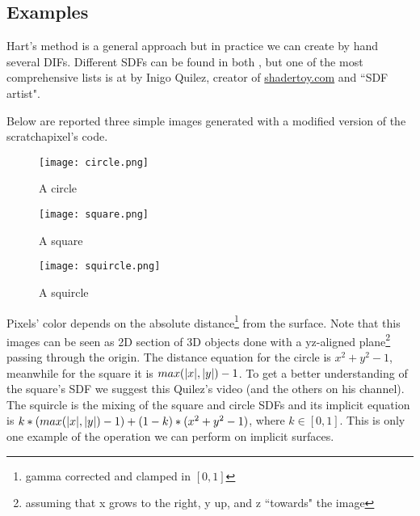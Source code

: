 

\subsection{Examples}
Hart's method is a general approach but in practice we can create by hand several DIFs.
Different SDFs can be found in both \cite{hart1996,scratch_sdf}, but one of the most comprehensive lists is at \cite{iquilez_sdf} by Inigo Quilez, creator of \url{shadertoy.com}  and ``SDF artist".

Below are reported three simple images generated with a modified version of the scratchapixel's code\cite{scratch_sdf}.
\begin{figure}[!htb]
  \texttt{[image: circle.png]}
  \caption{A circle}\label{fig:circle}
\endminipage\hfill
{}
  \texttt{[image: square.png]}
  \caption{A square}\label{fig:square}
\endminipage\hfill
{}%
  \texttt{[image: squircle.png]}
  \caption{A squircle}\label{fig:squircle}
\endminipage
\end{figure}
Pixels' color depends on the absolute distance\footnote{gamma corrected and clamped in $[0,1]$} from the surface.
Note that this images can be seen as 2D section of 3D objects done with a yz-aligned plane\footnote{assuming that x grows to the right, y up, and z ``towards" the image} passing through the origin.
The distance equation for the circle is $x^2 + y^2 - 1$, meanwhile for the square it is $max(\lvert x \lvert, \lvert y \lvert) - 1$.
To get a better understanding of the square's SDF we suggest this Quilez's video \cite{iquilez_sdf_box} (and the others on his channel).
The squircle is the mixing of the square and circle SDFs and its implicit equation is
$ k * (max(\lvert x \lvert, \lvert y \lvert) - 1) + (1-k) * (x^2 + y^2 - 1) $, where $k \in [0,1]$.
This is only one example of the operation we can perform on implicit surfaces.


